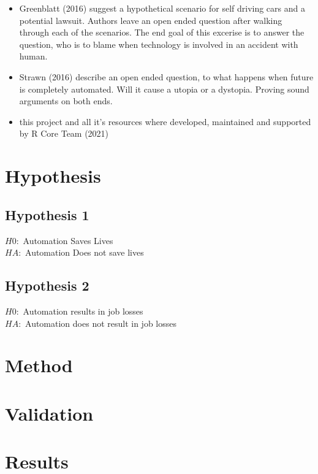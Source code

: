 \documentclass[
  english,
  man]{apa7}
\begin{document}
\begin{itemize}
\item
  Greenblatt (2016) suggest a hypothetical scenario for self driving cars and a potential lawsuit. Authors leave an open ended question after walking through each of the scenarios. The end goal of this excerise is to answer the question, who is to blame when technology is involved in an accident with human.
\item
  Strawn (2016) describe an open ended question, to what happens when future is completely automated. Will it cause a utopia or a dystopia. Proving sound arguments on both ends.
\item
  this project and all it's resources where developed, maintained and supported by R Core Team (2021)
\end{itemize}

\hypertarget{hypothesis}{%
\section{Hypothesis}\label{hypothesis}}

\hypertarget{hypothesis-1}{%
\subsection{Hypothesis 1}\label{hypothesis-1}}

\(H0:\) Automation Saves Lives\\
\(HA:\) Automation Does not save lives

\hypertarget{hypothesis-2}{%
\subsection{Hypothesis 2}\label{hypothesis-2}}

\(H0:\) Automation results in job losses\\
\(HA:\) Automation does not result in job losses

\hypertarget{method}{%
\section{Method}\label{method}}

\hypertarget{validation}{%
\section{Validation}\label{validation}}

\hypertarget{results}{%
\section{Results}\label{results}}
\end{document}
